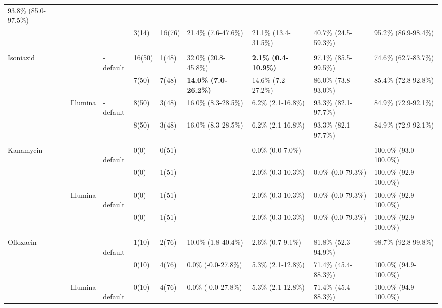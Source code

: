 \begin{table}
{\begin{tabular}{@{}lllllllll@{}}
  93.8\% (85.0-97.5\%) \\
 &
   &
  \mykrobe{} &
  3(14) &
  16(76) &
  21.4\% (7.6-47.6\%) &
  21.1\% (13.4-31.5\%) &
  40.7\% (24.5-59.3\%) &
  95.2\% (86.9-98.4\%) \\ \\ \cmidrule(l){3-9} 
\multirow{4}{*}{Isoniazid} &
  \multirow{2}{*}{\ont{}} &
  \mykrobe{}-default &
  16(50) &
  1(48) &
  32.0\% (20.8-45.8\%) &
  \textbf{2.1\% (0.4-10.9\%)} &
  97.1\% (85.5-99.5\%) &
  74.6\% (62.7-83.7\%) \\
 &
   &
  \mykrobe{} &
  7(50) &
  7(48) &
  \textbf{14.0\% (7.0-26.2\%)} &
  14.6\% (7.2-27.2\%) &
  86.0\% (73.8-93.0\%) &
  85.4\% (72.8-92.8\%) \\
 &
  \multirow{2}{*}{Illumina} &
  \mykrobe{}-default &
  8(50) &
  3(48) &
  16.0\% (8.3-28.5\%) &
  6.2\% (2.1-16.8\%) &
  93.3\% (82.1-97.7\%) &
  84.9\% (72.9-92.1\%) \\
 &
   &
  \mykrobe{} &
  8(50) &
  3(48) &
  16.0\% (8.3-28.5\%) &
  6.2\% (2.1-16.8\%) &
  93.3\% (82.1-97.7\%) &
  84.9\% (72.9-92.1\%) \\ \\ \cmidrule(l){3-9} 
\multirow{4}{*}{Kanamycin} &
  \multirow{2}{*}{\ont{}} &
  \mykrobe{}-default &
  0(0) &
  0(51) &
  - &
  0.0\% (0.0-7.0\%) &
  - &
  100.0\% (93.0-100.0\%) \\
 &
   &
  \mykrobe{} &
  0(0) &
  1(51) &
  - &
  2.0\% (0.3-10.3\%) &
  0.0\% (0.0-79.3\%) &
  100.0\% (92.9-100.0\%) \\
 &
  \multirow{2}{*}{Illumina} &
  \mykrobe{}-default &
  0(0) &
  1(51) &
  - &
  2.0\% (0.3-10.3\%) &
  0.0\% (0.0-79.3\%) &
  100.0\% (92.9-100.0\%) \\
 &
   &
  \mykrobe{} &
  0(0) &
  1(51) &
  - &
  2.0\% (0.3-10.3\%) &
  0.0\% (0.0-79.3\%) &
  100.0\% (92.9-100.0\%) \\ \\ \cmidrule(l){3-9} 
\multirow{4}{*}{Ofloxacin} &
  \multirow{2}{*}{\ont{}} &
  \mykrobe{}-default &
  1(10) &
  2(76) &
  10.0\% (1.8-40.4\%) &
  2.6\% (0.7-9.1\%) &
  81.8\% (52.3-94.9\%) &
  98.7\% (92.8-99.8\%) \\
 &
   &
  \mykrobe{} &
  0(10) &
  4(76) &
  0.0\% (-0.0-27.8\%) &
  5.3\% (2.1-12.8\%) &
  71.4\% (45.4-88.3\%) &
  100.0\% (94.9-100.0\%) \\
 &
  \multirow{2}{*}{Illumina} &
  \mykrobe{}-default &
  0(10) &
  4(76) &
  0.0\% (-0.0-27.8\%) &
  5.3\% (2.1-12.8\%) &
  71.4\% (45.4-88.3\%) &
  100.0\% (94.9-100.0\%) \\

\end{tabular}}
\end{table}
